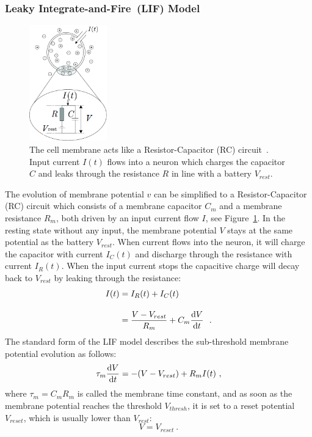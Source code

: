 \subsubsection{Leaky Integrate-and-Fire~(LIF) Model}

\begin{figure}[tb!]
	\centering
	\includegraphics[width=0.3\textwidth]{pics_snn/RC.png}
	\caption[The cell membrane acts like a RC circuit~\citep{gerstner2014neuronal}.]
	{The cell membrane acts like a Resistor-Capacitor (RC) circuit~\citep{gerstner2014neuronal}.
	Input current $I(t)$ flows into a neuron which charges the capacitor $C$ and leaks through the resistance $R$ in line with a battery $V_{rest}$.}
	\label{Fig:rc}
\end{figure}

The evolution of membrane potential $v$ can be simplified to a Resistor-Capacitor (RC) circuit which consists of a membrane capacitor $C_m$ and a membrane resistance $R_m$, both driven by an input current flow $I$, see Figure~\ref{Fig:rc}.
In the resting state without any input, the membrane potential $V$ stays at the same potential as the battery $V_{rest}$.
When current flows into the neuron, it will charge the capacitor with current $I_C(t)$ and discharge through the resistance with current $I_R(t)$.
When the input current stops the capacitive charge will decay back to $V_{rest}$ by leaking through the resistance:
\begin{equation}
\begin{aligned}
	I(t) &= I_R(t) + I_C(t) \\[10pt]
	&= \dfrac{V-V_{rest}}{R_m} + C_m \dfrac{\mathrm{d} V}{\mathrm{d} t}~~.
\end{aligned}
\label{equ:LIF_current}
\end{equation}
The standard form of the LIF model describes the sub-threshold membrane potential evolution as follows:
\begin{equation}
	\tau_m \dfrac{\mathrm{d} V}{\mathrm{d} t} = -(V-V_{rest}) + R_m I(t)~,
\end{equation}
where $\tau_m = C_m R_m$ is called the membrane time constant, and as soon as the membrane potential reaches the threshold $V_{thresh}$, it is set to a reset potential $V_{reset}$, which is usually lower than $V_{rest}$: 
\begin{equation}
V = V_{reset}~.
\end{equation}

